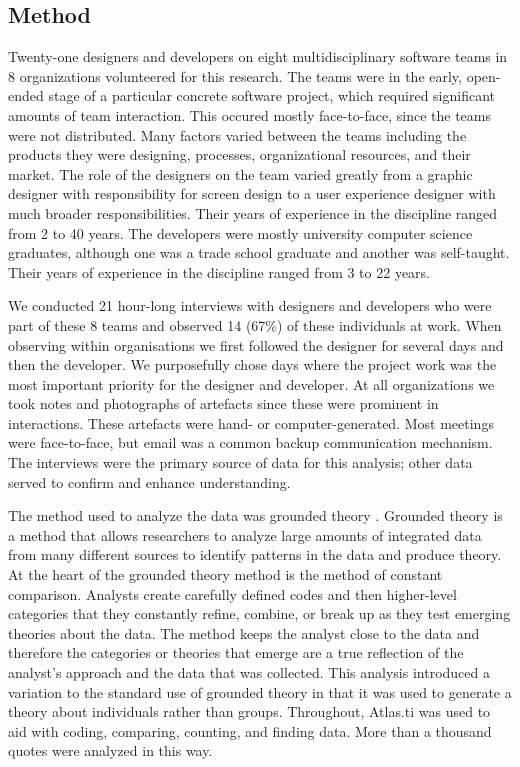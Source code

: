 \documentclass{chi2009}
\begin{document}
\subsection{Method}

Twenty-one designers and developers on eight multidisciplinary software teams in 8 organizations volunteered for this research.  The teams were in the early, open-ended stage of a particular concrete software project, which required significant amounts of team interaction. This occured mostly face-to-face, since the teams were not distributed.  Many factors varied between the teams including the products they were designing, processes, organizational resources, and their market. The role of the designers on the team varied greatly from a graphic designer with responsibility for screen design to a user experience designer with much broader responsibilities. Their years of experience in the discipline ranged from 2 to 40 years. The developers were mostly university computer science graduates, although one was a trade school graduate and another was self-taught. Their years of experience in the discipline ranged from 3 to 22 years.   

We conducted 21 hour-long interviews with designers and developers who were part of these 8 teams and observed 14 (67\%) of these individuals at work. When observing within organisations we first followed the designer for several days and then the developer.  We purposefully chose days where the project work was the most important priority for the designer and developer.  At all organizations we took notes and photographs of artefacts since these were prominent in interactions. These artefacts were hand- or computer-generated. Most meetings were face-to-face, but email was a common backup communication mechanism. The interviews were the primary source of data for this analysis; other data served to confirm and enhance understanding. 

The method used to analyze the data was grounded theory \cite{Strauss1998a}. Grounded theory is a method that allows researchers to analyze large amounts of integrated data from many different sources to identify patterns in the data and produce theory.  At the heart of the grounded theory method is the method of constant comparison.  Analysts create carefully defined codes and then higher-level categories that they constantly refine, combine, or break up as they test emerging theories about the data.  The method keeps the analyst close to the data and therefore the categories or theories that emerge are a true reflection of the analyst's approach and the data that was collected. This analysis introduced a variation to the standard use of grounded theory in that it was used to generate a theory about individuals rather than groups. Throughout, Atlas.ti was used to aid with coding, comparing, counting, and finding data.  More than a thousand quotes were analyzed in this way. 
\end{document}
